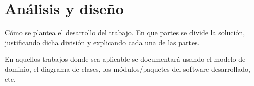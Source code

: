 \chapter{An\'{a}lisis y dise\~{n}o}
\newpage
Cómo se plantea el desarrollo del trabajo. En que partes se 
divide la solución, justificando dicha división y explicando 
cada una de las partes.

En aquellos trabajos donde sea aplicable se documentará 
usando el modelo de dominio, el diagrama de clases, los 
módulos/paquetes del software desarrollado, etc.
